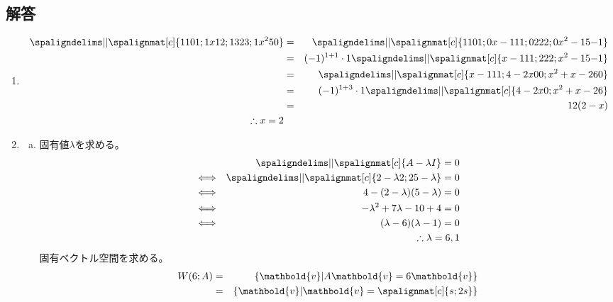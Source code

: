 \documentclass[dvipdfmx,titlepage, 11pt, a4paper]{jsarticle}%
\begin{document}
\subsection{解答}
\begin{enumerate}[(1)]
  \item 
  \begin{eqnarray*}
    \spaligndelims\vert\vert \spalignmat[c]{
      1 1 0 1;
      1 x 1 2;
      1 3 2 3;
      1 x^2 5 0
    } &=&
    \spaligndelims\vert\vert \spalignmat[c]{
      1 1 0 1;
      0 {x - 1} 1 1;
      0 2 2 2;
      0 {x^2 - 1} 5 {-1}
    }\\
    &=& (-1)^{1 + 1}\cdot 1
    \spaligndelims\vert\vert \spalignmat[c]{
      {x - 1} 1 1;
      2 2 2;
      {x^2 - 1} 5 {-1}
    }\\
    &=&
    \spaligndelims\vert\vert \spalignmat[c]{
      {x - 1} 1 1;
      {4 - 2x} 0 0;
      {x^2 + x - 2} 6 0
    }\\
    &=&(-1)^{1+3}\cdot 1
    \spaligndelims\vert\vert \spalignmat[c]{
      {4 - 2x} 0 ;
      {x^2 + x - 2} 6
    }\\
    &=& 12(2 - x)\\
    \therefore x = 2
  \end{eqnarray*}
  \item 
  \begin{enumerate}[(a)]
    \item 
    固有値$\lambda$を求める。
    \begin{eqnarray*}
      &&\spaligndelims\vert\vert \spalignmat[c]{
        A - \lambda I
      } = 0\\
      &\Longleftrightarrow&
      \spaligndelims\vert\vert \spalignmat[c]{
        {2 - \lambda} {2};
        {2} {5 - \lambda}
      } = 0\\
      &\Longleftrightarrow&
      4 - (2 - \lambda)(5 - \lambda) = 0\\
      &\Longleftrightarrow&
      -\lambda^2 + 7\lambda - 10 + 4 = 0\\
      &\Longleftrightarrow&
      (\lambda - 6)(\lambda - 1) = 0\\
      &&\therefore \lambda = 6, 1
    \end{eqnarray*}
    固有ベクトル空間を求める。
    \begin{eqnarray*}
      W(6;A) &=& \left\{\mathbold{v}|A\mathbold{v} = 6\mathbold{v}\right\}\\
      &=& \left\{\mathbold{v}|\mathbold{v} = \spalignmat[c]{
        {s};
        {2s}
      }\right\}\\

\end{eqnarray*}
\end{enumerate}
\end{enumerate}
\end{document}
